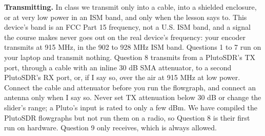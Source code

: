 \documentclass{exam}
\begin{document}
\textbf{Transmitting.} In class we transmit only into a cable, into a shielded
enclosure, or at very low power in an ISM band, and only when the lesson says to.
This device's band is an FCC Part 15 frequency, not a U.S. ISM band, and a signal the
course makes never goes out on the real device's frequency: your encoder transmits at
915 MHz, in the 902 to 928 MHz ISM band. Questions 1 to 7 run on your laptop and transmit nothing. Question 8 transmits from a
PlutoSDR's TX port, through a cable with an inline 30 dB SMA attenuator, to a second
PlutoSDR's RX port, or, if I say so, over the air at 915 MHz at low
power. Connect the cable and attenuator before you run the flowgraph, and connect an
antenna only when I say so. Never set TX attenuation below 30 dB or change the
slider's range; a Pluto's input is rated to only a few dBm. We have compiled the
PlutoSDR flowgraphs but not run them on a radio, so Question 8 is their first run on
hardware. Question 9 only receives, which is always allowed.
\end{document}
